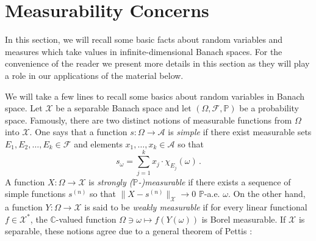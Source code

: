 \documentclass{article}
\newcommand{\C}{\mathbb C}
\newcommand{\A}{\mathcal{A}}
\renewcommand{\P}{\mathbb{P}}
\newcommand{\<}{\langle}
\renewcommand{\>}{\rangle}
\theoremstyle{definition}
\numberwithin{equation}{section}
\begin{document}
\appendix
\section{Measurability Concerns}
In this section, we will recall some basic facts about random variables and measures which take values in infinite-dimensional Banach spaces. For the convenience of the reader we present more details in this section as they will play a role in our applications of the material below.  

We will take a few lines to recall some basics about random variables in Banach space. Let $\mathcal{X}$ be a separable Banach space and let $(\Omega, \mathcal{F}, \P)$ be a probability space. Famously, there are two distinct notions of measurable functions from $\Omega$ into $\mathcal{X}$. One says that a function $s:\Omega \to \A$ is \textit{simple} if there exist measurable sets $E_1, E_2, \dots, E_k\in \mathcal{F}$ and elements $x_1, \dots, x_k\in \A$ so that 
    \[
        s_\omega = \sum_{j=1}^k x_j \cdot \chi_{E_j}(\omega)\,.
    \] A function $X:\Omega \to \mathcal{X}$ is \textit{strongly ($\P$-)measurable} if there exists a sequence of simple functions $s^{(n)}$ so that $\|X-s^{(n)}\|_{\mathcal{X}} \to 0$ $\P$-a.e. $\omega$. On the other hand, a function $Y:\Omega \to \mathcal{X}$ is said to be \textit{weakly measurable} if for every linear functional $f\in \mathcal{X}^*$, the $\C$-valued function $\Omega \ni \omega \longmapsto f(Y(\omega))$ is Borel measurable. If $\mathcal{X}$ is separable, these notions agree due to a general theorem of Pettis \cite{Pettis}: 
\end{document}
